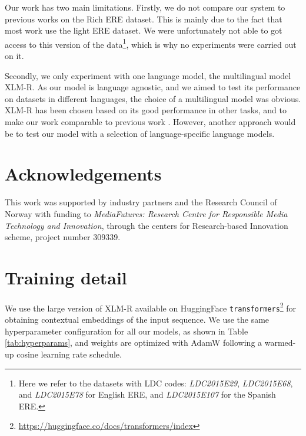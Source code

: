 \documentclass[11pt]{article}
\begin{document}
Our work has two main limitations. Firstly, we do not compare our system to previous works on the Rich ERE dataset. This is mainly due to the fact that most work  use the light ERE \citep{song-etal-2015-light} dataset. We were unfortunately not able to got access to this version of the data\footnote{Here we refer to the datasets with LDC codes: \textit{LDC2015E29}, \textit{LDC2015E68}, and \textit{LDC2015E78} for English ERE, and \textit{LDC2015E107} for the Spanish ERE.}, which is why no experiments were carried out on it. 

Secondly, we only experiment with one language model, the multilingual model XLM-R. As our model is language agnostic, and we aimed to test its performance on datasets in different languages, the choice of a multilingual model was obvious. XLM-R has been chosen based on its good performance in other tasks, and to make our work comparable to previous work \cite{you2022eventgraph}.
However, another approach would be to test our model with a selection of language-specific language models. 

\section*{Acknowledgements}

This work was supported by industry partners and the Research Council of Norway with funding to \textit{MediaFutures: Research Centre for Responsible Media Technology and Innovation}, through the centers for Research-based Innovation scheme, project number 309339.




\clearpage
\newpage
\appendix

\section{Training detail}
\label{append:params}

We use the large version of XLM-R available on HuggingFace \texttt{transformers}\footnote{\url{https://huggingface.co/docs/transformers/index}} for obtaining contextual embeddings of the input sequence. We use the same hyperparameter configuration for all our models, as shown in Table \ref{tab:hyperparams}, and weights are optimized with AdamW \citep{loshchilov2017decoupled} following a warmed-up cosine learning rate schedule.
\end{document}
